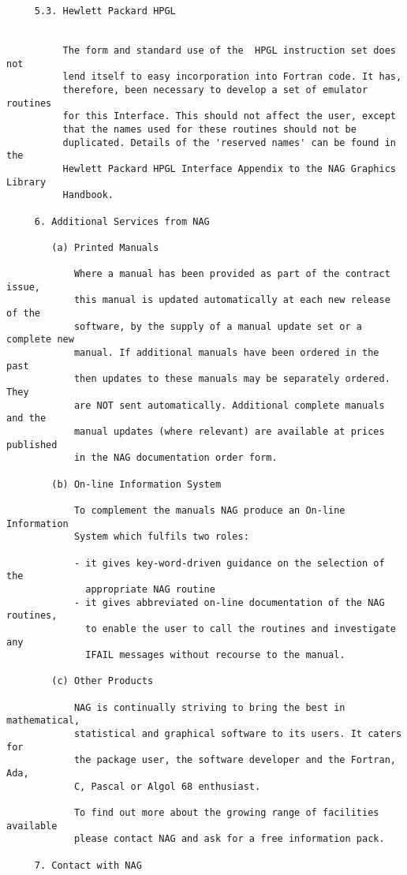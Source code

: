 \begin{verbatim}
     5.3. Hewlett Packard HPGL


          The form and standard use of the  HPGL instruction set does not
          lend itself to easy incorporation into Fortran code. It has,
          therefore, been necessary to develop a set of emulator routines
          for this Interface. This should not affect the user, except
          that the names used for these routines should not be
          duplicated. Details of the 'reserved names' can be found in the
          Hewlett Packard HPGL Interface Appendix to the NAG Graphics Library
          Handbook.

     6. Additional Services from NAG

        (a) Printed Manuals

            Where a manual has been provided as part of the contract issue,
            this manual is updated automatically at each new release of the
            software, by the supply of a manual update set or a complete new
            manual. If additional manuals have been ordered in the past
            then updates to these manuals may be separately ordered. They
            are NOT sent automatically. Additional complete manuals and the
            manual updates (where relevant) are available at prices published
            in the NAG documentation order form.

        (b) On-line Information System

            To complement the manuals NAG produce an On-line Information
            System which fulfils two roles:

            - it gives key-word-driven guidance on the selection of the
              appropriate NAG routine
            - it gives abbreviated on-line documentation of the NAG routines,
              to enable the user to call the routines and investigate any
              IFAIL messages without recourse to the manual.

        (c) Other Products

            NAG is continually striving to bring the best in mathematical,
            statistical and graphical software to its users. It caters for
            the package user, the software developer and the Fortran, Ada,
            C, Pascal or Algol 68 enthusiast.

            To find out more about the growing range of facilities available
            please contact NAG and ask for a free information pack.

     7. Contact with NAG


\end{verbatim}
